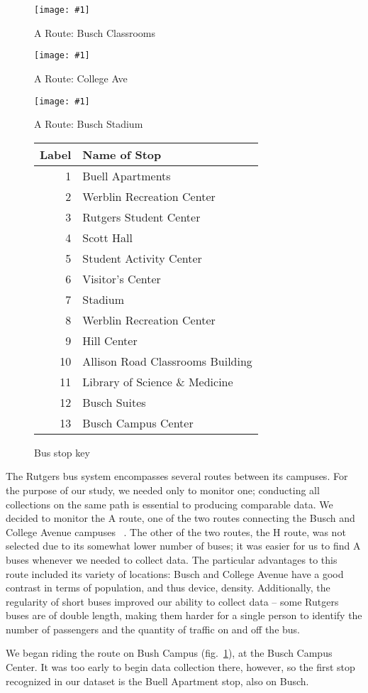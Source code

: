 \documentclass[12pt,journal,compsoc]{IEEEtran} %
\newcommand{\minipic}[3]{
  \begin{figure}[!t]
    \centering
    \texttt{[image: \#1]}
    \caption{#2}
    \label{#3}
  \end{figure}
}
\begin{document}
\minipic{aroutebusch}{A Route: Busch Classrooms} {fig:aroutebusch}
\minipic{aroutecollegeave}{A Route: College Ave}{fig:aroutecollegeave}
\minipic{aroutestadium}{A Route: Busch Stadium}{fig:aroutestadium}

\begin{figure}[!t]
  \centering
  \begin{tabular}{ r|l }
    Label & Name of Stop\\ \hline
    1 & Buell Apartments\\
    2 & Werblin Recreation Center\\
    3 & Rutgers Student Center\\
    4 & Scott Hall\\
    5 & Student Activity Center\\
    6 & Visitor's Center\\
    7 & Stadium\\
    8 & Werblin Recreation Center\\
    9 & Hill Center\\
    10 & Allison Road Classrooms Building\\
    11 & Library of Science \& Medicine\\
    12 & Busch Suites\\
    13 & Busch Campus Center\\
  \end{tabular}
  \caption{Bus stop key}
  \label{fig:stops}
\end{figure}

The Rutgers bus system encompasses several routes between its campuses.
For the purpose of our study, we needed only to monitor one; conducting all collections on the same path is essential to producing comparable data.
We decided to monitor the A route, one of the two routes connecting the Busch and College Avenue campuses ~\cite{busroutes}.
The other of the two routes, the H route, was not selected due to its somewhat lower number of buses; it was easier for us to find A buses whenever we needed to collect data.
The particular advantages to this route included its variety of locations: Busch and College Avenue have a good contrast in terms of population, and thus device, density.
Additionally, the regularity of short buses improved our ability to collect data -- some Rutgers buses are of double length, making them harder for a single person to identify the number of passengers and the quantity of traffic on and off the bus.

We began riding the route on Bush Campus (fig.~\ref{fig:aroutebusch}), at the Busch Campus Center.
It was too early to begin data collection there, however, so the first stop recognized in our dataset is the Buell Apartment stop, also on Busch.
\end{document}
